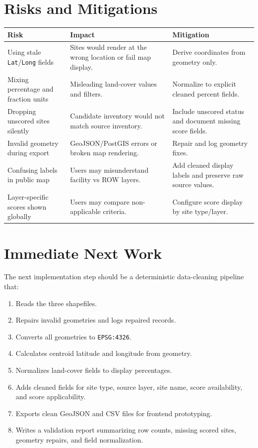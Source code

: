 \documentclass[11pt]{article}
\newcommand{\code}[1]{\nolinkurl{#1}}
\begin{document}
\section{Risks and Mitigations}

\begin{longtable}{L{0.30\textwidth} L{0.30\textwidth} L{0.30\textwidth}}
\toprule
\textbf{Risk} & \textbf{Impact} & \textbf{Mitigation} \\
\midrule
\endhead
Using stale \code{Lat}/\code{Long} fields & Sites would render at the wrong location or fail map display. & Derive coordinates from geometry only. \\
Mixing percentage and fraction units & Misleading land-cover values and filters. & Normalize to explicit cleaned percent fields. \\
Dropping unscored sites silently & Candidate inventory would not match source inventory. & Include unscored status and document missing score fields. \\
Invalid geometry during export & GeoJSON/PostGIS errors or broken map rendering. & Repair and log geometry fixes. \\
Confusing labels in public map & Users may misunderstand facility vs ROW layers. & Add cleaned display labels and preserve raw source values. \\
Layer-specific scores shown globally & Users may compare non-applicable criteria. & Configure score display by site type/layer. \\
\bottomrule
\end{longtable}

\section{Immediate Next Work}

The next implementation step should be a deterministic data-cleaning pipeline that:

\begin{enumerate}
  \item Reads the three shapefiles.
  \item Repairs invalid geometries and logs repaired records.
  \item Converts all geometries to \code{EPSG:4326}.
  \item Calculates centroid latitude and longitude from geometry.
  \item Normalizes land-cover fields to display percentages.
  \item Adds cleaned fields for site type, source layer, site name, score availability, and score applicability.
  \item Exports clean GeoJSON and CSV files for frontend prototyping.
  \item Writes a validation report summarizing row counts, missing scored sites, geometry repairs, and field normalization.
\end{enumerate}
\end{document}
